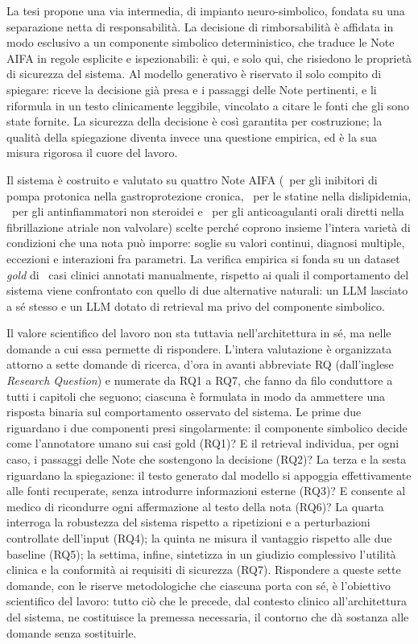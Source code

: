 La tesi propone una via intermedia, di impianto neuro-simbolico, fondata su una separazione netta di responsabilità. La decisione di rimborsabilità è affidata in modo esclusivo a un componente simbolico deterministico, che traduce le Note AIFA in regole esplicite e ispezionabili: è qui, e solo qui, che risiedono le proprietà di sicurezza del sistema. Al modello generativo è riservato il solo compito di spiegare: riceve la decisione già presa e i passaggi delle Note pertinenti, e li riformula in un testo clinicamente leggibile, vincolato a citare le fonti che gli sono state fornite. La sicurezza della decisione è così garantita per costruzione; la qualità della spiegazione diventa invece una questione empirica, ed è la sua misura rigorosa il cuore del lavoro.

Il sistema è costruito e valutato su quattro Note AIFA (\notezero\ per gli inibitori di pompa protonica nella gastroprotezione cronica, \notetredici\ per le statine nella dislipidemia, \notesessanta\ per gli antinfiammatori non steroidei e \notenova\ per gli anticoagulanti orali diretti nella fibrillazione atriale non valvolare) scelte perché coprono insieme l'intera varietà di condizioni che una nota può imporre: soglie su valori continui, diagnosi multiple, eccezioni e interazioni fra parametri. La verifica empirica si fonda su un dataset \emph{gold} di \goldn\ casi clinici annotati manualmente, rispetto ai quali il comportamento del sistema viene confrontato con quello di due alternative naturali: un LLM lasciato a sé stesso e un LLM dotato di retrieval ma privo del componente simbolico.

Il valore scientifico del lavoro non sta tuttavia nell'architettura in sé, ma nelle domande a cui essa permette di rispondere. L'intera valutazione è organizzata attorno a sette domande di ricerca, d'ora in avanti abbreviate RQ (dall'inglese \emph{Research Question}) e numerate da RQ1 a RQ7, che fanno da filo conduttore a tutti i capitoli che seguono; ciascuna è formulata in modo da ammettere una risposta binaria sul comportamento osservato del sistema. Le prime due riguardano i due componenti presi singolarmente: il componente simbolico decide come l'annotatore umano sui casi gold (RQ1)? E il retrieval individua, per ogni caso, i passaggi delle Note che sostengono la decisione (RQ2)? La terza e la sesta riguardano la spiegazione: il testo generato dal modello si appoggia effettivamente alle fonti recuperate, senza introdurre informazioni esterne (RQ3)? E consente al medico di ricondurre ogni affermazione al testo della nota (RQ6)? La quarta interroga la robustezza del sistema rispetto a ripetizioni e a perturbazioni controllate dell'input (RQ4); la quinta ne misura il vantaggio rispetto alle due baseline (RQ5); la settima, infine, sintetizza in un giudizio complessivo l'utilità clinica e la conformità ai requisiti di sicurezza (RQ7). Rispondere a queste sette domande, con le riserve metodologiche che ciascuna porta con sé, è l'obiettivo scientifico del lavoro: tutto ciò che le precede, dal contesto clinico all'architettura del sistema, ne costituisce la premessa necessaria, il contorno che dà sostanza alle domande senza sostituirle.

